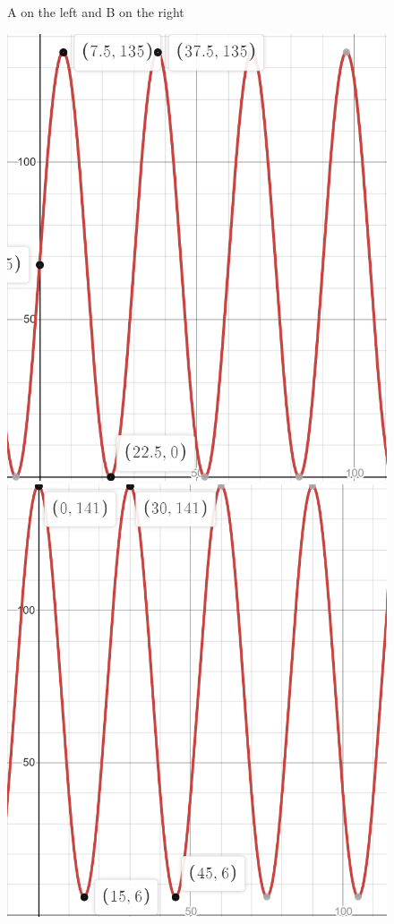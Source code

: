 \documentclass{ximera}
\begin{document}
\begin{exercise}
\begin{enumerate}
\begin{figure}[!h]
\begin{image}
\end{image}
\caption{A on the left and B on the right}
\end{figure}

\begin{figure}[!h]
\begin{image}
\includegraphics{ex2-c.png}
\hspace{20mm}
\includegraphics{ex2-d.png}

\end{image}
\end{figure}
\end{enumerate}
\end{exercise}
\end{document}
